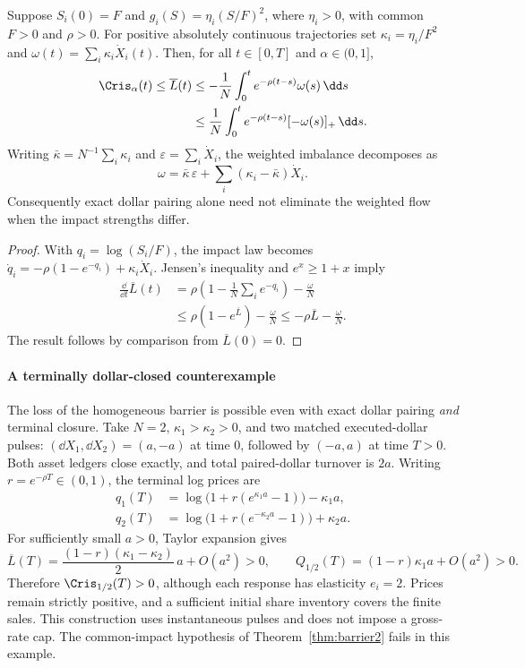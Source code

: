 \documentclass[review,hidelinks,onefignum,onetabnum]{siamonline250211}
\begin{document}
\begin{proposition}
\label{prop:heterogeneous-quadratic}
Suppose $S_i(0)=F$ and
$g_i(S)=\eta_i(S/F)^2$, where $\eta_i>0$, with common
$F>0$ and $\rho>0$. For positive absolutely continuous
trajectories set $\kappa_i=\eta_i/F^2$ and
$\omega(t)=\sum_i\kappa_i\dot X_i(t)$.
Then, for all $t\in[0,T]$ and $\alpha\in(0,1]$,
\[
\begin{aligned}
\Cris_\alpha(t)\le\overline L(t)
&\le-\frac1N\int_0^t e^{-\rho(t-s)}\omega(s)\,\dd s\\
&\le\frac1N\int_0^t e^{-\rho(t-s)}[-\omega(s)]_+\,\dd s.
\end{aligned}
\]
Writing $\bar\kappa=N^{-1}\sum_i\kappa_i$ and
$\varepsilon=\sum_i\dot X_i$, the weighted imbalance decomposes as
\[
\omega=\bar\kappa\,\varepsilon+
\sum_i(\kappa_i-\bar\kappa)\dot X_i.
\]
Consequently exact dollar pairing alone need not eliminate the
weighted flow when the impact strengths differ.
\end{proposition}
\begin{proof}
With $q_i=\log(S_i/F)$, the impact law becomes
$\dot q_i=-\rho(1-e^{-q_i})+\kappa_i\dot X_i$.
Jensen's inequality and $e^x\ge1+x$ imply
\[
\begin{aligned}
\frac{\dd}{\dd t}\overline L(t)
&=\rho\left(1-\frac1N\sum_i e^{-q_i}\right)
-\frac{\omega}{N}\\
&\le\rho(1-e^{\overline L})-\frac{\omega}{N}
\le-\rho\overline L-\frac{\omega}{N}.
\end{aligned}
\]
The result follows by comparison from $\overline L(0)=0$.
\end{proof}

\paragraph{A terminally dollar-closed counterexample}
The loss of the homogeneous barrier is possible even with
exact dollar pairing \emph{and} terminal closure. Take $N=2$,
$\kappa_1>\kappa_2>0$, and two matched executed-dollar pulses:
$(\dd X_1,\dd X_2)=(a,-a)$ at time $0$, followed by
$(-a,a)$ at time $T>0$. Both asset ledgers close exactly,
and total paired-dollar turnover is $2a$.
Writing $r=e^{-\rho T}\in(0,1)$, the terminal log prices are
\[
\begin{aligned}
q_1(T)&=\log\bigl(1+r(e^{\kappa_1a}-1)\bigr)-\kappa_1a,\\
q_2(T)&=\log\bigl(1+r(e^{-\kappa_2a}-1)\bigr)+\kappa_2a.
\end{aligned}
\]
For sufficiently small $a>0$, Taylor expansion gives
\[
\overline L(T)=
\frac{(1-r)(\kappa_1-\kappa_2)}2\,a+O(a^2)>0,
\qquad
Q_{1/2}(T)=(1-r)\kappa_1a+O(a^2)>0.
\]
Therefore $\Cris_{1/2}(T)>0$, although each response has
elasticity $e_i=2$. Prices remain strictly positive, and a
sufficient initial share inventory covers the finite sales.
This construction uses instantaneous pulses and does not impose a
gross-rate cap. The common-impact hypothesis of Theorem~\ref{thm:barrier2}
fails in this example.
\end{document}
